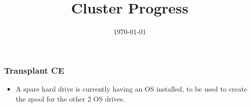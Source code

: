 \documentclass{beamer}
\title{Cluster Progress}
\date{\today}
\begin{document}

\begin{frame}
  \maketitle
\end{frame}


\begin{frame}
  \frametitle{Transplant CE}

  \begin{itemize}
  \item A spare hard drive is currently having an OS installed, to be used to create the zpool for the other 2 OS drives.
    
  \end{itemize}
\end{frame}



\end{document}
